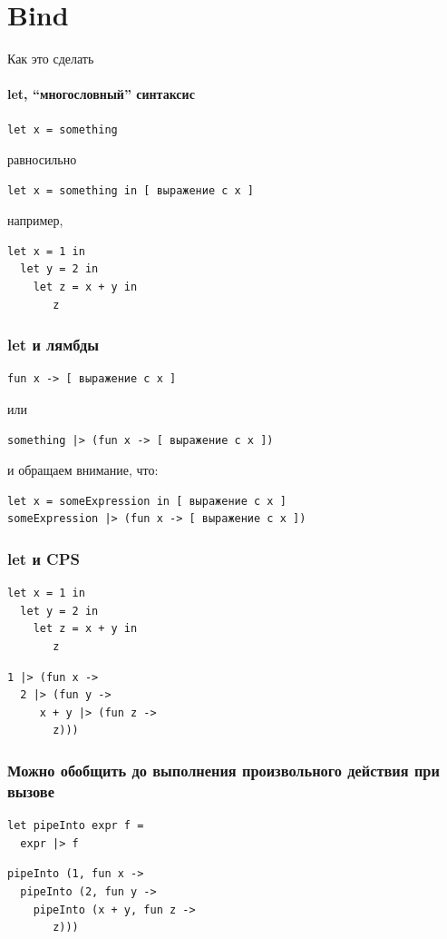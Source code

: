 \documentclass{../../slides-style}
\begin{document}
    \section{Bind}

    \begin{frame}[fragile]{Как это сделать}
        \framesubtitle{let, \enquote{многословный} синтаксис}
        \begin{verbatim}
let x = something
        \end{verbatim}
        равносильно
        \begin{verbatim}
let x = something in [ выражение c x ]
        \end{verbatim}
        например,
        \begin{verbatim}
let x = 1 in
  let y = 2 in
    let z = x + y in
       z
        \end{verbatim}
    \end{frame}

    \begin{frame}[fragile]
        \frametitle{let и лямбды}
        \begin{verbatim}
fun x -> [ выражение c x ]
        \end{verbatim}
        или
        \begin{verbatim}
something |> (fun x -> [ выражение c x ])
        \end{verbatim}
        и обращаем внимание, что:
        \begin{verbatim}
let x = someExpression in [ выражение c x ]
someExpression |> (fun x -> [ выражение c x ])
        \end{verbatim}
    \end{frame}

    \begin{frame}[fragile]
        \frametitle{let и CPS}
        \begin{verbatim}
let x = 1 in
  let y = 2 in
    let z = x + y in
       z
        \end{verbatim}
        \begin{verbatim}
1 |> (fun x ->
  2 |> (fun y -> 
     x + y |> (fun z -> 
       z)))
        \end{verbatim}
    \end{frame}

    \begin{frame}[fragile]
        \frametitle{Можно обобщить до выполнения произвольного действия при вызове}
        \begin{verbatim}
let pipeInto expr f =
  expr |> f
        \end{verbatim}
        \begin{verbatim}
pipeInto (1, fun x ->
  pipeInto (2, fun y -> 
    pipeInto (x + y, fun z -> 
       z)))
        \end{verbatim}
    \end{frame}
\end{document}
